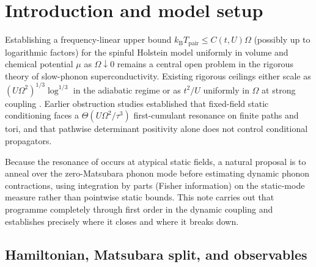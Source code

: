 \documentclass[11pt]{article}
\theoremstyle{definition}
\theoremstyle{remark}
\newcommand{\Tpair}{T_{\mathrm{pair}}}
\newcommand{\kB}{k_{\mathrm{B}}}
\begin{document}
\section{Introduction and model setup}
\label{sec:intro}

Establishing a frequency-linear upper bound $\kB \Tpair \le C(t,U)\Omega$ (possibly up to logarithmic factors) for the spinful Holstein model \cite{holstein1959} uniformly in volume and chemical potential $\mu$ as $\Omega \downarrow 0$ remains a central open problem in the rigorous theory of slow-phonon superconductivity. Existing rigorous ceilings either scale as $(U\Omega^2)^{1/3}\log^{1/3}$ in the adiabatic regime \cite{rens2026adiabatic,rens2026imaginary} or as $t^2/U$ uniformly in $\Omega$ at strong coupling \cite{rens2026strong}. Earlier obstruction studies \cite{rens2026barriers1,rens2026barriers2} established that fixed-field static conditioning faces a $\Theta(U\Omega^2/\tau^3)$ first-cumulant resonance on finite paths and tori, and that pathwise determinant positivity alone does not control conditional propagators.

Because the resonance of \cite{rens2026barriers2} occurs at atypical static fields, a natural proposal is to anneal over the zero-Matsubara phonon mode before estimating dynamic phonon contractions, using integration by parts (Fisher information) on the static-mode measure rather than pointwise static bounds. This note carries out that programme completely through first order in the dynamic coupling and establishes precisely where it closes and where it breaks down.

\subsection{Hamiltonian, Matsubara split, and observables}
\end{document}
